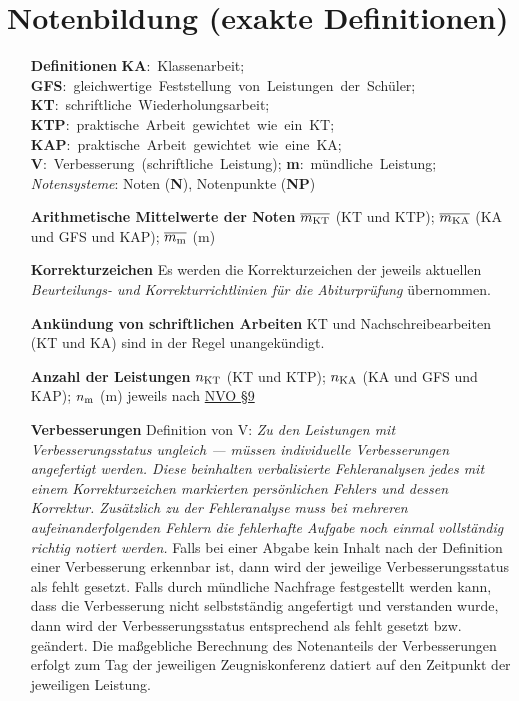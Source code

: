 \section{Notenbildung (exakte Definitionen)}

\begin{enumerate}[label=\textbf{\textbullet}, align=left, leftmargin=*]
	\item[\textbf{Definitionen}] { \scriptsize \mbox{\textbf{KA}: Klassenarbeit}; \mbox{\textbf{GFS}: gleichwertige Feststellung von Leistungen der Schüler}; \mbox{\textbf{KT}: schriftliche Wiederholungsarbeit};  \linebreak \mbox{\textbf{KTP}: praktische Arbeit gewichtet wie ein KT}; \mbox{\textbf{KAP}: praktische Arbeit gewichtet wie eine KA}; \mbox{\textbf{V}: Verbesserung (schriftliche Leistung)}; \mbox{\textbf{m}: mündliche Leistung}; \linebreak \textit{Notensysteme}: Noten (\textbf{N}), Notenpunkte (\textbf{NP}) }
	\item[\textbf{Arithmetische Mittelwerte der Noten}] $\overline{m_{\mathrm{KT}}}$ (KT und KTP); $\overline{m_{\mathrm{KA}}}$ (KA und GFS und KAP); $\overline{m_{\mathrm{m}}}$ (m)
	\item[\textbf{Korrekturzeichen}] Es werden die Korrekturzeichen der jeweils aktuellen \textit{\glqq Beurteilungs- und Korrekturrichtlinien für die Abiturprüfung\grqq{}} übernommen.
	\item[\textbf{Ankündung von schriftlichen Arbeiten}] KT und Nachschreibearbeiten (KT und KA) sind in der Regel unangekündigt.
	\item[\textbf{Anzahl der Leistungen}] $n_{\mathrm{KT}}$ (KT und KTP); $n_{\mathrm{KA}}$ (KA und GFS und KAP); $n_{\mathrm{m}}$ (m) jeweils nach \href{\nvourl}{NVO §9}
	\item[\textbf{Verbesserungen}] { \scriptsize Definition von V: \glqq\textit{Zu den Leistungen mit Verbesserungsstatus ungleich \glqq ---\grqq{} müssen \textit{individuelle} Verbesserungen angefertigt werden. Diese beinhalten verbalisierte Fehleranalysen jedes mit einem Korrekturzeichen markierten \textit{persönlichen} Fehlers und dessen Korrektur. Zusätzlich zu der Fehleranalyse muss bei mehreren aufeinanderfolgenden Fehlern die fehlerhafte Aufgabe noch einmal vollständig richtig notiert werden.}\grqq{} Falls bei einer Abgabe kein Inhalt nach der Definition einer Verbesserung erkennbar ist, dann wird der jeweilige Verbesserungsstatus als \glqq fehlt\grqq{} gesetzt.  Falls durch mündliche Nachfrage festgestellt werden kann, dass die Verbesserung nicht selbstständig angefertigt und verstanden wurde, dann wird der Verbesserungsstatus entsprechend als \glqq fehlt\grqq{} gesetzt bzw. geändert. Die maßgebliche Berechnung des Notenanteils der Verbesserungen erfolgt zum Tag der jeweiligen Zeugniskonferenz datiert auf den Zeitpunkt der jeweiligen Leistung.}

\end{enumerate}
